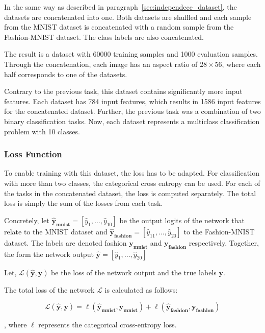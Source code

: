 In the same way as described in paragraph~\ref{sec:independece_dataset}, the datasets are concatenated into one.
Both datasets are shuffled and each sample from the MNIST dataset is concatenated with a random sample from the Fashion-MNIST dataset.
The class labels are also concatenated.

The result is a dataset with 60000 training samples and 1000 evaluation samples.
Through the concatenation, each image has an aspect ratio of $28 \times 56$, where each half corresponds to one of the datasets.

Contrary to the previous task, this dataset contains significantly more input features.
Each dataset has 784 input features, which results in 1586 input features for the concatenated dataset.
Further, the previous task was a combination of two binary classification tasks.
Now, each dataset represents a multiclass classification problem with 10 classes.

\subsubsection{Loss Function}
To enable training with this dataset, the loss has to be adapted.
For classification with more than two classes, the categorical cross entropy can be used.
For each of the tasks in the concatenated dataset, the loss is computed separately.
The total loss is simply the sum of the losses from each task.

Concretely, let $\mathbf{\hat y_{mnist}} = \left[\hat y_1, \dots, \hat y_{10}\right]$ be the output logits of the network that relate to the MNIST dataset and $\mathbf{\hat y_{fashion}} = \left[\hat y_{11}, \dots, \hat y_{20}\right]$ to the Fashion-MNIST dataset.
The labels are denoted fashion $\mathbf{y_{mnist}}$ and $\mathbf{y_{fashion}}$ respectively.
Together, the form the network output $\mathbf{\hat y} = \left[\hat y_1, \dots, \hat y_{20}\right]$

Let, $\mathcal{L} (\mathbf{\hat y}, \mathbf{y})$ be the loss of the network output and the true labels $\mathbf{y}$.

The total loss of the network $\mathcal{L}$ is calculated as follows:

\[
\mathcal{L}  (\mathbf{\hat y}, \mathbf{y})
= \ell  (\mathbf{\hat y_{mnist}}, \mathbf{y_{mnist}})
+ \ell (\mathbf{\hat y_{fashion}}, \mathbf{y_{fashion}})
\]

, where $\ell$ represents the categorical cross-entropy loss.

